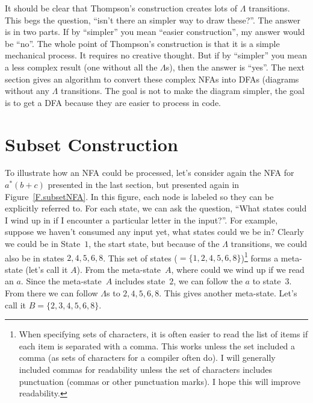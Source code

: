 \documentclass[letterpaper,12pt,openany,reqno]{book}%
\begin{document}
It should be clear that Thompson's construction creates lots of $\Lambda$ transitions. This begs the question, ``isn't there an simpler way to draw these?''. The answer is in two parts. If by ``simpler'' you mean ``easier construction'', my answer would be ``no''. The whole point of Thompson's construction is that it is a simple mechanical process. It requires no creative thought. But if by ``simpler'' you mean a less complex result (one without all the $\Lambda$s), then the answer is ``yes''. The next section gives an algorithm to convert these complex NFAs into DFAs (diagrams without any $\Lambda$ transitions. The goal is not to make the diagram simpler, the goal is to get a DFA because they are easier to process in code.

\section{Subset Construction}\label{S.Subset.Construction}

To illustrate how an NFA could be processed, let's consider again the NFA for $a^* (b + c)$ presented in the last section, but presented again in Figure~\ref{F.subsetNFA}. In this figure, each node is labeled so they can be explicitly referred to. For each state, we can ask the question, ``What states could I wind up in if I encounter a particular letter in the input?''. For example, suppose we haven't consumed any input yet, what states could we be in? Clearly we could be in State~$1$, the start state, but because of the $\Lambda$ transitions, we could also be in states $2, 4, 5, 6, 8$. This set of states ($=\{1, 2, 4, 5, 6, 8\}$)\footnote{When specifying sets of characters,  it is often easier to read the list of items if each item is separated with a comma. This works unless the set included a comma (as sets of characters for a compiler often do). I will generally included commas for readability unless the set of characters includes punctuation (commas or other punctuation marks). I hope this will improve readability.}
forms a meta-state (let's call it $A$). From the meta-state~$A$, where could we wind up if we read an $a$. Since the meta-state~$A$ includes state~$2$, we can follow the $a$ to state~$3$. From there we can follow $\Lambda$s to $2, 4, 5, 6, 8$. This gives another meta-state. Let's call it $B = \{2, 3, 4, 5, 6, 8\}$. 
\end{document}
